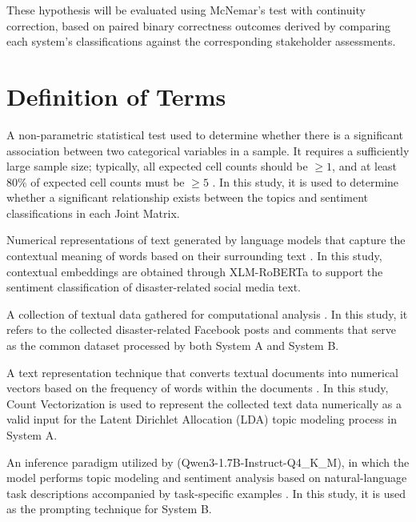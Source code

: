 \noindent These hypothesis will be evaluated using McNemar's test with continuity correction, based on paired binary correctness outcomes derived by comparing each system's classifications against the corresponding stakeholder assessments.


\section*{Definition of Terms}

\begin{description}[style=sameline,leftmargin=0pt]
	\item[Chi-Square.] A non-parametric statistical test used to determine whether there is a significant association between two categorical variables in a sample. It requires a sufficiently large sample size; typically, all expected cell counts should be \(\ge 1\), and at least \(80\%\) of expected cell counts must be \(\ge 5\) \parencite{singh2020}. In this study, it is used to determine whether a significant relationship exists between the topics and sentiment classifications in each Joint Matrix.

	\item[Contextual Embeddings.] Numerical representations of text generated by language models that capture the contextual meaning of words based on their surrounding text \parencite{barbieri-etal-2022-xlm}. In this study, contextual embeddings are obtained through XLM-RoBERTa to support the sentiment classification of disaster-related social media text.

	\item[Corpus.] A collection of textual data gathered for computational analysis \parencite{xiao2010corpus}. In this study, it refers to the collected disaster-related Facebook posts and comments that serve as the common dataset processed by both System A and System B.

	\item[Count Vectorization.] A text representation technique that converts textual documents into numerical vectors based on the frequency of words within the documents \parencite{kozhevnikov2020}. In this study, Count Vectorization is used to represent the collected text data numerically as a valid input for the Latent Dirichlet Allocation (LDA) topic modeling process in System A.

	\item[Few-Shot Prompting.] An inference paradigm utilized by \sysB{} (Qwen3-1.7B-Instruct-Q4\_K\_M), in which the model performs topic modeling and sentiment analysis based on natural-language task descriptions accompanied by task-specific examples \parencite{gadesha2024few}. In this study, it is used as the prompting technique for System B.


\end{description}
